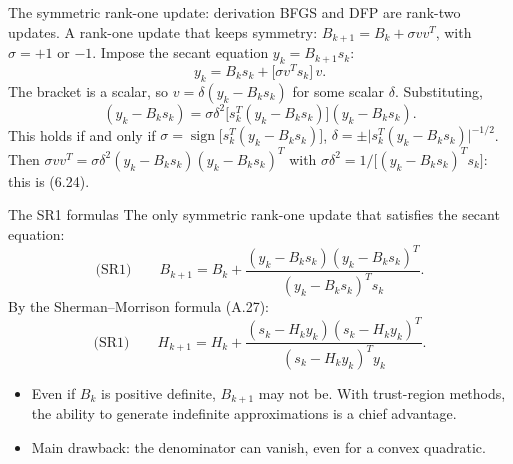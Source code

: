 \documentclass[aspectratio=169,12pt]{beamer}
\begin{document}
\begin{frame}{The symmetric rank-one update: derivation}
  BFGS and DFP are rank-two updates. A rank-one update that keeps symmetry:
  $B_{k+1}=B_{k}+\sigma vv^{T}$, with $\sigma=+1$ or $-1$.
  Impose the secant equation $y_{k}=B_{k+1}s_{k}$:
  \[ y_{k}=B_{k}s_{k}+\big[\sigma v^{T}s_{k}\big]\,v . \tag{6.22} \]
  The bracket is a scalar, so $v=\delta(y_{k}-B_{k}s_{k})$ for some scalar $\delta$. Substituting,
  \[
    (y_{k}-B_{k}s_{k})=\sigma\delta^{2}\big[s_{k}^{T}(y_{k}-B_{k}s_{k})\big](y_{k}-B_{k}s_{k}) .
    \tag{6.23}
  \]
  This holds if and only if\quad
  $\sigma=\operatorname{sign}\big[s_{k}^{T}(y_{k}-B_{k}s_{k})\big]$,\quad
  $\delta=\pm\big|s_{k}^{T}(y_{k}-B_{k}s_{k})\big|^{-1/2}$.
  Then $\sigma vv^{T}=\sigma\delta^{2}(y_{k}-B_{k}s_{k})(y_{k}-B_{k}s_{k})^{T}$ with $\sigma\delta^{2}=1/\big[(y_{k}-B_{k}s_{k})^{T}s_{k}\big]$:
  this is (6.24).
\end{frame}

\begin{frame}{The SR1 formulas}
  The only symmetric rank-one update that satisfies the secant equation:
  \[
    \text{(SR1)}\qquad
    B_{k+1}=B_{k}+\frac{(y_{k}-B_{k}s_{k})(y_{k}-B_{k}s_{k})^{T}}{(y_{k}-B_{k}s_{k})^{T}s_{k}} .
    \tag{6.24}
  \]
  By the Sherman--Morrison formula (A.27):
  \[
    \text{(SR1)}\qquad
    H_{k+1}=H_{k}+\frac{(s_{k}-H_{k}y_{k})(s_{k}-H_{k}y_{k})^{T}}{(s_{k}-H_{k}y_{k})^{T}y_{k}} .
    \tag{6.25}
  \]

  \begin{itemize}\setlength\itemsep{0.3em}
    \item Even if $B_{k}$ is positive definite, $B_{k+1}$ \alert{may not be}. With trust-region
      methods, the ability to generate indefinite approximations is a chief advantage.
    \item Main drawback: \alert{the denominator can vanish}, even for a convex quadratic.
  \end{itemize}
\end{frame}
\end{document}
